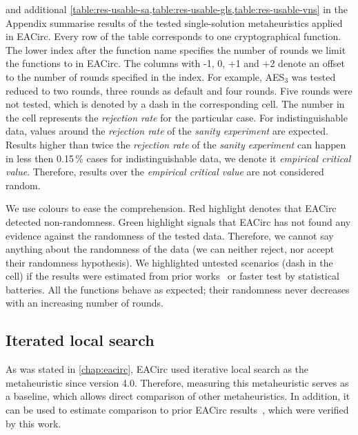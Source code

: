 \documentclass[
  print, %
  Table,   %
  nolof,     %
  nolot,     %
  11pt, %
  oneside  %
]{fithesis3}
\begin{document}
 and additional \cref{table:res-usable-sa,table:res-usable-gls,table:res-usable-vns} in the Appendix summarise results of the tested single-solution metaheuristics applied in EACirc. Every row of the table corresponds to one cryptographical function. The lower index after the function name specifies the number of rounds we limit the functions to in EACirc. The columns with -1, 0, +1 and +2 denote an offset to the number of rounds specified in the index. For example, AES$_{3}$ was tested reduced to two rounds, three rounds as default and four rounds. Five rounds were not tested, which is denoted by a dash in the corresponding cell. The number in the cell represents the \textit{rejection rate} for the particular case. For indistinguishable data, values around the \textit{rejection rate} of the \textit{sanity experiment} are expected. Results higher than twice the \textit{rejection rate} of the \textit{sanity experiment} can happen in less then 0.15\,\% cases for indistinguishable data, we denote it \textit{empirical critical value}. Therefore, results over the \textit{empirical critical value} are not considered random.

We use colours to ease the comprehension. Red highlight denotes that EACirc detected non-randomness. Green highlight signals that EACirc has not found any evidence against the randomness of the tested data. Therefore, we cannot say anything about the randomness of the data (we can neither reject, nor accept their randomness hypothesis). We highlighted untested scenarios (dash in the cell) if the results were estimated from prior works~\cite{svenda2013towards,sys2014constructing,kubicek2016new,ukropBcThesis} or faster test by statistical batteries. All the functions behave as expected; their randomness never decreases with an increasing number of rounds.

\subsection{Iterated local search}
\label{subsec:res-ss-ils}

As was stated in \cref{chap:eacirc}, EACirc used iterative local search as the metaheuristic since version 4.0. Therefore, measuring this metaheuristic serves as a baseline, which allows direct comparison of other metaheuristics. In addition, it can be used to estimate comparison to prior EACirc results~\cite{svenda2013towards,sys2014constructing,kubicek2016new,ukropBcThesis}, which were verified by this work.
\end{document}
